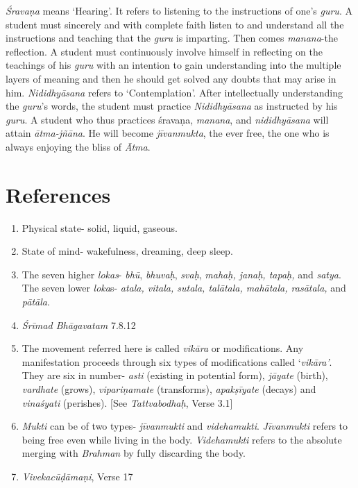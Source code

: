 \emph{Śravaṇa} means `Hearing'. It refers to listening to the instructions of one's \emph{guru}. A student must sincerely and with complete faith listen to and understand all the instructions and teaching that the \emph{guru} is imparting. Then comes \emph{manana}-the reflection. A student must continuously involve himself in reflecting on the teachings of his \emph{guru} with an intention to gain understanding into the multiple layers of meaning and then he should get solved any doubts that may arise in him. \emph{Nididhyāsana} refers to `Contemplation'. After intellectually understanding the \emph{guru}'s words, the student must practice \emph{Nididhyāsana} as instructed by his \emph{guru}. A student who thus practices śravaṇa, \emph{manana}, and \emph{nididhyāsana} will attain \emph{ātma-jñāna}. He will become \emph{jīvanmukta}, the ever free, the one who is always enjoying the bliss of \emph{Ātma}.

\section*{References}

\begin{enumerate}
\item
  Physical state- solid, liquid, gaseous.
\item
  State of mind- wakefulness, dreaming, deep sleep.
\item
  The seven higher \emph{lokas}- \emph{bhū}, \emph{bhuvaḥ}, \emph{svaḥ}, \emph{mahaḥ, janaḥ, tapaḥ,} and \emph{satya}. The seven lower \emph{loka}s- \emph{atala, vitala, sutala, talātala, mahātala, rasātala,} and \emph{pātāla}.
\item
  \emph{Śrīmad Bhāgavatam} 7.8.12
\item
  The movement referred here is called \emph{vikāra} or modifications. Any manifestation proceeds through six types of modifications called `\emph{vikāra'}. They are six in number- \emph{asti} (existing in potential form), \emph{jāyate} (birth), \emph{vardhate} (grows), \emph{vipariṇamate} (transforms), \emph{apakṣīyate} (decays) and \emph{vinaśyati} (perishes). {[}See \emph{Tattvabodhaḥ}, Verse 3.1{]}
\item
  \emph{Mukti} can be of two types- \emph{jīvanmukti} and \emph{videhamukti}. \emph{Jīvanmukti} refers to being free even while living in the body. \emph{Videhamukti} refers to the absolute merging with \emph{Brahman} by fully discarding the body.
\item
  \emph{Vivekacūḍāmaṇi}, Verse 17
\end{enumerate}
